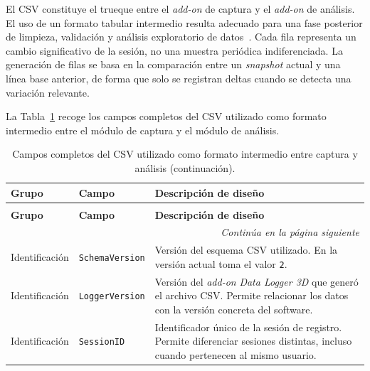 El CSV constituye el trueque entre el \textit{\textit{add-on}} de captura y el \textit{\textit{add-on}} de análisis. El uso de un formato tabular intermedio resulta adecuado para una fase posterior de limpieza, validación y análisis exploratorio de datos~\cite{mckinney2022python,fayyad1996kdd}. Cada fila representa un cambio significativo de la sesión, no una muestra periódica indiferenciada. La generación de filas se basa en la comparación entre un \textit{snapshot} actual y una línea base anterior, de forma que solo se registran deltas cuando se detecta una variación relevante.

La Tabla~\ref{tab:c-campos-csv} recoge los campos completos del CSV utilizado como formato intermedio entre el módulo de captura y el módulo de análisis.

\clearpage
{\pagestyle{empty}\thispagestyle{empty}
\begin{landscape}
\begingroup
\scriptsize
\setlength{\tabcolsep}{4pt}
\renewcommand{\arraystretch}{1.18}

\begin{longtable}{p{3.4cm}p{4.2cm}p{15.5cm}}
\caption{Campos completos del CSV utilizado como formato intermedio entre captura y análisis.}
\label{tab:c-campos-csv}\\
\toprule
\textbf{Grupo} & \textbf{Campo} & \textbf{Descripción de diseño} \\
\midrule
\endfirsthead

\caption[]{Campos completos del CSV utilizado como formato intermedio entre captura y análisis (continuación).}\\
\toprule
\textbf{Grupo} & \textbf{Campo} & \textbf{Descripción de diseño} \\
\midrule
\endhead

\midrule
\multicolumn{3}{r}{\textit{Continúa en la página siguiente}}\\
\endfoot

\bottomrule
\endlastfoot

Identificación & \texttt{SchemaVersion} & Versión del esquema CSV utilizado. En la versión actual toma el valor \texttt{2}. \\

Identificación & \texttt{LoggerVersion} & Versión del \textit{\textit{add-on}} \textit{Data Logger 3D} que generó el archivo CSV. Permite relacionar los datos con la versión concreta del software. \\

Identificación & \texttt{SessionID} & Identificador único de la sesión de registro. Permite diferenciar sesiones distintas, incluso cuando pertenecen al mismo usuario. \\


\end{longtable}
\end{landscape}}
